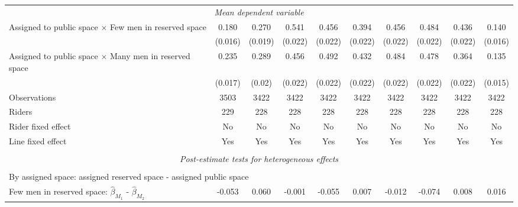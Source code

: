\begin{tabular}{l*{9}{c}}
\multicolumn{10}{c}{\textit{Mean dependent variable}} \\ Assigned to public space $\times$ Few men in reserved space&       0.180         &       0.270         &       0.541         &       0.456         &       0.394         &       0.456         &       0.484         &       0.436         &       0.140         \\
\,                  &     (0.016)         &     (0.019)         &     (0.022)         &     (0.022)         &     (0.022)         &     (0.022)         &     (0.022)         &     (0.022)         &     (0.016)         \\
Assigned to public space $\times$ Many men in reserved space&       0.235         &       0.289         &       0.456         &       0.492         &       0.432         &       0.484         &       0.478         &       0.364         &       0.135         \\
\,                  &     (0.017)         &      (0.02)         &     (0.022)         &     (0.022)         &     (0.022)         &     (0.022)         &     (0.022)         &     (0.022)         &     (0.015)         \\
Observations        &        3503         &        3422         &        3422         &        3422         &        3422         &        3422         &        3422         &        3422         &        3422         \\
Riders              &         229         &         228         &         228         &         228         &         228         &         228         &         228         &         228         &         228         \\
Rider fixed effect  &          No         &          No         &          No         &          No         &          No         &          No         &          No         &          No         &          No         \\
Line fixed effect   &         Yes         &         Yes         &         Yes         &         Yes         &         Yes         &         Yes         &         Yes         &         Yes         &         Yes         \\
\hline \\[-1ex]  \multicolumn{10}{c}{\textit{Post-estimate tests for heterogeneous effects}} \\\\[-1ex] \multicolumn{10}{l}{By assigned space: assigned reserved space - assigned public space} \\ \quad Few men in reserved space: $\hat\beta_{M_1}$ - $\hat\beta_{M_2}$&      -0.053         &       0.060         &      -0.001         &      -0.055         &       0.007         &      -0.012         &      -0.074         &       0.008         &       0.016         \\

\end{tabular}
